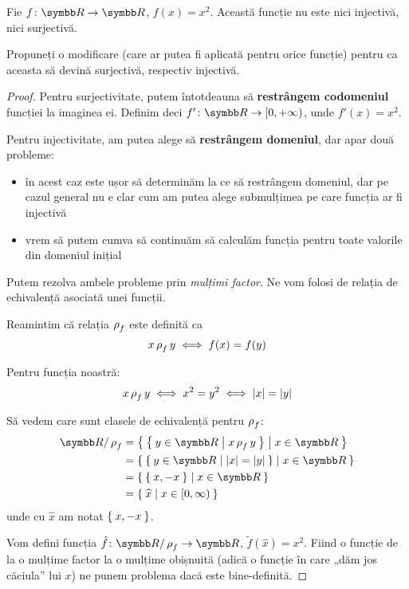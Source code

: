 \begin{exercise}
Fie \(\function{f}{\reals}{\reals}\), \(f(x) = x^2\). Această funcție nu este nici injectivă, nici surjectivă.

Propuneți o modificare (care ar putea fi aplicată pentru orice funcție) pentru ca aceasta să devină surjectivă, respectiv injectivă.
\end{exercise}
\begin{proof}
Pentru surjectivitate, putem întotdeauna să \textbf{restrângem codomeniul} funcției la imaginea ei. Definim deci \(\function{f'}{\reals}{[0, +\infty)}\), unde \(f'(x) = x^2\).

Pentru injectivitate, am putea alege să \textbf{restrângem domeniul}, dar apar două probleme:
\begin{itemize}
    \item în acest caz este ușor să determinăm la ce să restrângem domeniul, dar pe cazul general nu e clar cum am putea alege submulțimea pe care funcția ar fi injectivă
    \item vrem să putem cumva să continuăm să calculăm funcția pentru toate valorile din domeniul inițial
\end{itemize}
Putem rezolva ambele probleme prin \emph{mulțimi factor}. Ne vom folosi de relația de echivalență asociată unei funcții.

Reamintim că relația \(\operatorname{\rho}_f\) este definită ca
\[
    x \operatorname{\rho}_f y \iff f(x) = f(y)
\]

Pentru funcția noastră:
\[
    x \operatorname{\rho}_f y \iff x^2 = y^2 \iff \left\lvert x \right\rvert = \left\lvert y \right\rvert
\]

Să vedem care sunt clasele de echivalență pentru \(\operatorname{\rho}_f\):
\begin{align*}
    \reals/\rhoequiv_f &= \Set{ \Set{ y \in \reals | x \rhoequiv_f y } | x \in \reals } \\
        &= \Set{ \Set{ y \in \reals | \abs{x} = \abs{y} } | x \in \reals } \\
        &= \Set{ \Set{ x, -x } | x \in \reals } \\
        &= \Set{ \widehat{x} | x \in [0, \infty) }
\end{align*}
unde cu \(\widehat{x}\) am notat \(\Set{ x, -x }\).

Vom defini funcția \(\function{\tilde{f}}{\reals/\rhoequiv_f}{\reals}\), \(\tilde{f}(\widehat{x}) = x^2\). Fiind o funcție de la o mulțime factor la o mulțime obișnuită (adică o funcție în care „dăm jos căciula” lui \(x\)) ne punem problema dacă este bine-definită. 


\end{proof}
